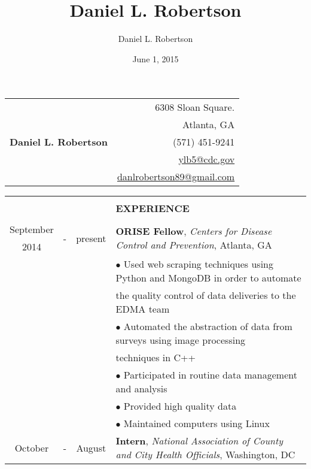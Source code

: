 \documentclass[11pt]{article}
\title{Daniel L. Robertson}
\date{June 1, 2015}
\author{Daniel L. Robertson}
\begin{document}
    \begin{table}[ht]
        \begin{tabular}{p{13cm}r}
            \multirow{5}{*}{\hspace*{1cm}\huge\textbf{Daniel L. Robertson}} & 6308 Sloan Square.\\
            & Atlanta, GA\\
            & (571) 451-9241\\
            & \href{mailto:ylb5@cdc.gov}{ylb5@cdc.gov}\\
            & \href{mailto:danlrobertson89@gmail.com}{danlrobertson89@gmail.com}\\
        \end{tabular}
        \begin{tabular}{@{\hspace{0mm}}c@{\hspace{1mm}}c@{\hspace{3mm}}cl}
            & & & \color{maroon}{\rule{12cm}{1.0pt}}\\
            & & & \large{\textbf{EXPERIENCE}}\\
            & & & \color{maroon}{\rule{12cm}{1.0pt}}\\
            September & \multirow{2}{*}{-} & \multirow{2}{*}{present} & \multirow{2}{*}{\textbf{ORISE Fellow}, \textit{Centers for Disease Control and Prevention}, Atlanta, GA}\\
            2014 & & &\\
            & & & $\bullet$ Used web scraping techniques using Python and MongoDB in order to automate\\
            & & & \hspace*{3mm}the quality control of data deliveries to the EDMA team\\
            & & & $\bullet$ Automated the abstraction of data from surveys using image processing\\
            & & & \hspace*{3mm}techniques in C++\\
            & & & $\bullet$ Participated in routine data management and analysis\\
            & & & $\bullet$ Provided high quality data \\
            & & & $\bullet$ Maintained computers using Linux\\
            October & \multirow{2}{*}{-} & August & \multirow{2}{*}{\textbf{Intern}, \textit{National Association of County and City Health Officials}, Washington, DC}\\

\end{tabular}
\end{table}
\end{document}
